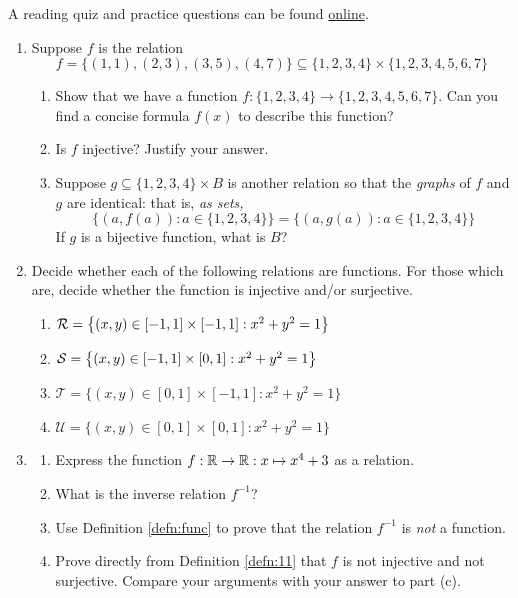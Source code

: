 \begin{exercises}{}{}
	A reading quiz and practice questions can be found \href{http://www.math.uci.edu/~ndonalds/math13/selftest/7-2-functions.html}{online}.


\begin{enumerate}
  \item Suppose $f$ is the relation
  \[
  	f=\bigl\{(1,1),(2,3),(3,5),(4,7)\bigr\} \subseteq\{1,2,3,4\}\times\{1,2,3,4,5,6,7\}
  \]
  \begin{enumerate}
    \item Show that we have a function $f:\{1,2,3,4\}\to\{1,2,3,4,5,6,7\}$. Can you find a concise formula $f(x)$ to describe this function?
    \item Is $f$ injective? Justify your answer.
    \item Suppose $g\subseteq\{1,2,3,4\}\times B$ is another relation so that the \emph{graphs} of $f$ and $g$ are identical: that is, \emph{as sets,}
    \[
    	\bigl\{(a,f(a)):a\in\{1,2,3,4\}\bigr\} = \bigl\{(a,g(a)):a\in\{1,2,3,4\}\bigr\}
    \]
    If $g$ is a bijective function, what is $B$?
  \end{enumerate}
  
  \item Decide whether each of the following relations are functions. For those which are, decide whether the function is injective and/or surjective.
  \begin{enumerate}
    \item $\mathcal{R}=\bigl\{(x,y)\in[-1,1]\times[-1,1]:x^2+y^2=1\bigr\}$
    \item $\mathcal{S}=\bigl\{(x,y)\in[-1,1]\times[0,1]:x^2+y^2=1\bigr\}$
    \item $\mathcal T=\bigl\{(x,y)\in[0,1]\times[-1,1]:x^2+y^2=1\bigr\}$
    \item $\mathcal U=\bigl\{(x,y)\in[0,1]\times[0,1]:x^2+y^2=1\bigr\}$
  \end{enumerate}
    
  
  \item\begin{enumerate}
    \item Express the function $f:\mathbb{R}\to\mathbb{R}:x\mapsto x^4+3$ as a relation.
    \item What is the inverse relation $f^{-1}$?
    \item Use Definition \ref{defn:func} to prove that the relation $f^{-1}$ is \emph{not} a function.
    \item Prove directly from Definition \ref{defn:11} that $f$ is not injective and not surjective. Compare your arguments with your answer to part (c).
  \end{enumerate}
  

\end{enumerate}
\end{exercises}

